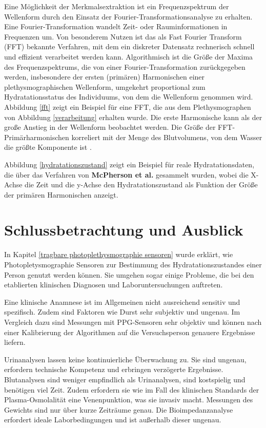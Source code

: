 \documentclass[10pt,a4paper,headinclude,twoside, plainheadsepline, open=right, numbers=noenddot, twocolumn]{article}
\begin{document}
Eine Möglichkeit der Merkmalsextraktion ist ein Frequenzspektrum der Wellenform durch den Einsatz der Fourier-Transformationsanalyse zu erhalten.
Eine Fourier-Transformation wandelt Zeit- oder Rauminformationen in Frequenzen um. 
Von besonderem Nutzen ist das als Fast Fourier Transform (FFT) bekannte Verfahren, mit dem ein diskreter Datensatz rechnerisch schnell und effizient verarbeitet werden kann. 
Algorithmisch ist die Größe der Maxima des Frequenzspektrums, die von einer Fourier-Transformation zurückgegeben werden, insbesondere der ersten (primären) Harmonischen einer plethysmographischen Wellenform, umgekehrt proportional zum Hydratationsstatus des Individuums, von dem die Wellenform genommen wird. 
Abbildung \ref{fft} zeigt ein Beispiel für eine FFT, die aus dem Plethysmographen von Abbildung \ref{verarbeitung} erhalten wurde. 
Die erste Harmonische kann als der große Anstieg in der Wellenform beobachtet werden.
Die Größe der FFT-Primärharmonischen korreliert mit der Menge des Blutvolumens, von dem Wasser die größte Komponente ist \cite{mcpherson2015systems}.


Abbildung \ref{hydratationszustand} zeigt ein Beispiel für reale Hydratationsdaten, die über das Verfahren von \textbf{McPherson et al.} gesammelt wurden, wobei die X-Achse die Zeit und die y-Achse den Hydratationszustand als Funktion der Größe der primären Harmonischen anzeigt.



\section{Schlussbetrachtung und Ausblick}
\label{schlussbetrachtung und ausblick}

In Kapitel \ref{tragbare photoplethysmographie sensoren} wurde erklärt, wie Photopletysmographie Sensoren zur Bestimmung des Hydratationszustandes einer Person genutzt werden können.
Sie umgehen sogar einige Probleme, die bei den etablierten klinischen Diagnosen und Laboruntersuchungen auftreten.

Eine klinische Anamnese ist im Allgemeinen nicht ausreichend sensitiv und spezifisch. 
Zudem sind Faktoren wie Durst sehr subjektiv und ungenau.
Im Vergleich dazu sind Messungen mit PPG-Sensoren sehr objektiv und können nach einer Kalibrierung der Algorithmen auf die Versuchsperson genauere Ergebnisse liefern.

Urinanalysen lassen keine kontinuierliche Überwachung zu.
Sie sind ungenau, erfordern technische Kompetenz und erbringen verzögerte Ergebnisse.
Blutanalysen sind weniger empfindlich als Urinanalysen, sind kostspielig und benötigen viel Zeit.
Zudem erfordern sie wie im Fall des klinischen Standards der Plasma-Osmolalität eine Venenpunktion, was sie invasiv macht.
Messungen des Gewichts sind nur über kurze Zeiträume genau.
Die Bioimpedanzanalyse erfordert ideale Laborbedingungen und ist außerhalb dieser ungenau.
\end{document}
